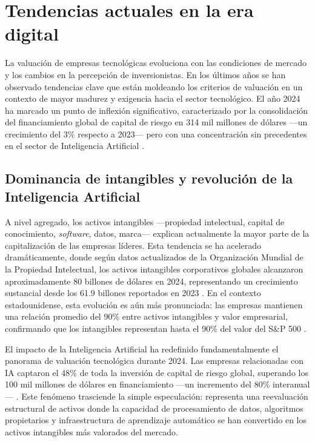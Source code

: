 \section{Tendencias actuales en la era digital}

La valuación de empresas tecnológicas evoluciona con las condiciones de mercado y los cambios en la percepción de inversionistas. En los últimos años se han observado tendencias clave que están moldeando los criterios de valuación en un contexto de mayor madurez y exigencia hacia el sector tecnológico. El año 2024 ha marcado un punto de inflexión significativo, caracterizado por la consolidación del financiamiento global de capital de riesgo en 314 mil millones de dólares ---un crecimiento del 3\% respecto a 2023--- pero con una concentración sin precedentes en el sector de Inteligencia Artificial \citep{pitchbook2024,carta2024}.

\subsection{Dominancia de intangibles y revolución de la Inteligencia Artificial}

A nivel agregado, los activos intangibles ---propiedad intelectual, capital de conocimiento, \emph{software}, datos, marca--- explican actualmente la mayor parte de la capitalización de las empresas líderes. Esta tendencia se ha acelerado dramáticamente, donde según datos actualizados de la Organización Mundial de la Propiedad Intelectual, los activos intangibles corporativos globales alcanzaron aproximadamente 80 billones de dólares en 2024, representando un crecimiento sustancial desde los 61.9 billones reportados en 2023 \citep{wipo2025}. En el contexto estadounidense, esta evolución es aún más pronunciada: las empresas mantienen una relación promedio del 90\% entre activos intangibles y valor empresarial, confirmando que los intangibles representan hasta el 90\% del valor del S\&P 500 \citep{oceantomo2024}.

El impacto de la Inteligencia Artificial ha redefinido fundamentalmente el panorama de valuación tecnológica durante 2024. Las empresas relacionadas con IA captaron el 48\% de toda la inversión de capital de riesgo global, superando los 100 mil millones de dólares en financiamiento ---un incremento del 80\% interanual--- \citep{pitchbook2024}. Este fenómeno trasciende la simple especulación: representa una reevaluación estructural de activos donde la capacidad de procesamiento de datos, algoritmos propietarios y infraestructura de aprendizaje automático se han convertido en los activos intangibles más valorados del mercado.

